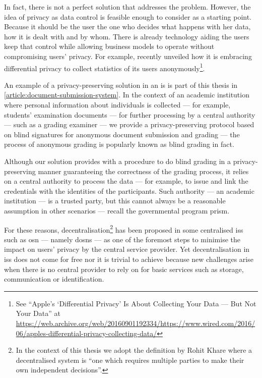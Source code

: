 \documentclass[showtrims,oldfontcommands]{kthesis}
\begin{document}
In fact, there is not a perfect solution that addresses the problem. However, the 
idea of privacy as data control is feasible enough to consider as a starting point. 
Because it should be the user the one who decides what happens with her data, how 
it is dealt with and by whom. There is already technology aiding the users keep 
that control while allowing business models to operate without compromising users' 
privacy. For example, \Apple recently unveiled how it is embracing differential 
privacy to collect statistics of its users anonymously\footnote{See ``Apple's `Differential Privacy' Is About Collecting Your Data --- But Not Your Data'' at \url{https://web.archive.org/web/20160901192334/https://www.wired.com/2016/06/apples-differential-privacy-collecting-data/}}.

An example of a privacy-preserving solution in an \ac{is} is part of 
this thesis in \cref{article:document-submission-system}. In the context of an academic 
institution where personal information about individuals is collected --- for example, 
students' examination documents --- for further processing by a central authority 
--- such as a grading examiner --- we provide a privacy-preserving protocol based 
on blind signatures for anonymous document submission and grading --- the process 
of anonymous grading is popularly known as blind grading in fact. 

Although our solution provides with a procedure to do blind grading in a privacy-preserving 
manner guaranteeing the correctness of the grading process, it relies on a central 
authority to process the data --- for example, to issue and link the credentials with 
the identities of the participants. Such authority --- an academic institution --- 
is a trusted party, but this cannot always be a reasonable assumption in other scenarios 
--- recall the governmental program \ac{prism}.

For these reasons, decentralisation\footnote{In the context of this thesis we adopt 
the definition by Rohit Khare where a decentralised system is ``one which requires 
multiple parties to make their own independent decisions''.} has been proposed in 
some centralised \acp{is} such as \ac{osn} --- namely \acp{dosn} --- 
as one of the foremost steps to minimise the impact on users' privacy by the central 
service provider. Yet decentralisation in \acp{is} does not come for 
free nor it is trivial to achieve because new challenges arise when there is no 
central provider to rely on for basic services such as storage, communication or 
identification.
\end{document}

